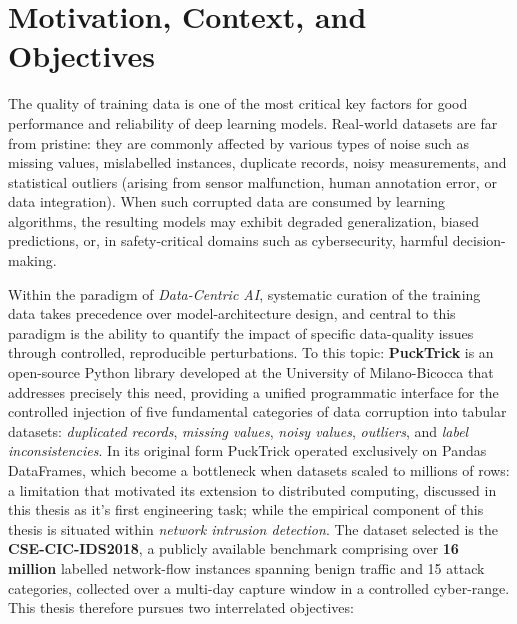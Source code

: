 \documentclass[a4paper, 9pt]{extarticle}
\begin{document}
\section{Motivation, Context, and Objectives}

The quality of training data is one of the most critical key factors for good performance and reliability of deep learning models. Real-world datasets are far from pristine: they are commonly affected by various types of noise such as missing values, mislabelled instances, duplicate records, noisy measurements, and statistical outliers (arising from sensor malfunction, human annotation error, or data integration).
When such corrupted data are consumed by learning algorithms, the resulting models may exhibit degraded generalization, biased predictions, or, in safety-critical domains such as cybersecurity, harmful decision-making.

Within the paradigm of \emph{Data-Centric AI}, systematic curation of the training data takes precedence over model-architecture design, and central to this paradigm is the ability to quantify the impact of specific data-quality issues through controlled, reproducible perturbations. To this topic: \textbf{PuckTrick} is an open-source Python library developed at the University of Milano-Bicocca that addresses precisely this need, providing a unified programmatic interface for the controlled injection of five fundamental categories of data corruption into
tabular datasets: \emph{duplicated records}, \emph{missing values}, \emph{noisy values}, \emph{outliers}, and \emph{label inconsistencies}. In its original form PuckTrick operated exclusively on Pandas DataFrames, which become a bottleneck when datasets scaled to millions of rows: a limitation that motivated its extension to distributed computing, discussed in this thesis as it's first engineering task; while the empirical component of this thesis is situated within \emph{network intrusion detection}. The dataset selected is the \textbf{CSE-CIC-IDS2018}, a publicly available benchmark comprising over \textbf{16 million} labelled network-flow instances spanning benign traffic and 15 attack categories, collected over a multi-day capture window in a controlled cyber-range. This thesis therefore pursues two interrelated objectives:
\end{document}
